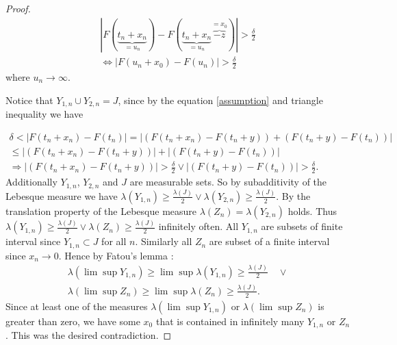\documentclass[english,12pt,a4paper,pdftex,sci,utf8]{aaltothesis} %
\begin{document}
\begin{proof}
\begin{equation*}
\begin{split}
\left| F(\underbrace{t_n+x_n}_{=u_n})-F(\underbrace{t_n+x_n}_{=u_n}\overbrace{-z}^{=x_0}) \right| > \frac{\delta}{2} \\
\Leftrightarrow \left| F(u_n+x_0)-F(u_n) \right| > \frac{\delta}{2}
\end{split}
\end{equation*}
where $u_n \rightarrow \infty$.

Notice that $Y_{1,n} \cup Y_{2,n}=J$, since by the equation \ref{assumption} and triangle inequality we have

\begin{equation*}
\begin{split}
\delta < \left| F(t_n+x_n) - F(t_n) \right| = \left| (F(t_n+x_n)-F(t_n+y)) + (F(t_n+y)-F(t_n)) \right| \\
\leq \left| (F(t_n+x_n)-F(t_n+y)) \right| + \left| (F(t_n+y)-F(t_n)) \right| \\
\Rightarrow \left| (F(t_n+x_n)-F(t_n+y)) \right|>\frac{\delta}{2} \lor \left| (F(t_n+y)-F(t_n)) \right|>\frac{\delta}{2}.
\end{split}
\end{equation*}
Additionally $Y_{1,n}$, $Y_{2,n}$ and $J$ are measurable sets. So by subadditivity of the Lebesque measure we have $\lambda(Y_{1,n}) \geq \frac{\lambda(J)}{2} \lor \lambda(Y_{2,n}) \geq \frac{\lambda(J)}{2}$. By the translation property of the Lebesque measure $\lambda(Z_n)=\lambda(Y_{2,n})$ holds. Thus $\lambda(Y_{1,n}) \geq \frac{\lambda(J)}{2} \lor \lambda(Z_n) \geq \frac{\lambda(J)}{2}$ infinitely often. All $Y_{1,n}$ are subsets of finite interval since $Y_{1,n} \subset J$ for all $n$. Similarly all $Z_n$ are subset of a finite interval since $x_n \rightarrow 0$. Hence by Fatou's lemma \cite{lahiri}:
\begin{equation*}
\begin{split}
\lambda(\lim \sup Y_{1,n}) \geq \lim \sup \lambda(Y_{1,n}) \geq \frac{\lambda(J)}{2}  \quad \lor \\
\lambda(\lim \sup Z_{n}) \geq \lim \sup \lambda(Z_{n}) \geq \frac{\lambda(J)}{2}.
\end{split}
\label{fatouapply}
\end{equation*}
Since at least one of the measures $\lambda(\lim \sup Y_{1,n})$ or $\lambda(\lim \sup Z_{n})$ is greater than zero, we have some $x_0$ that is contained in infinitely many $Y_{1,n}$ or $Z_n$. This was the desired contradiction.
\end{proof}
\end{document}
